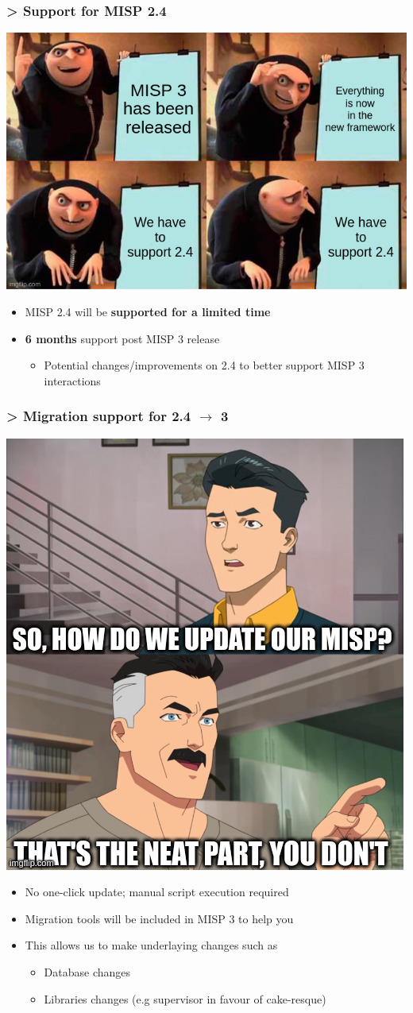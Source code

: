 \begin{frame}
    \frametitle{> Support for MISP 2.4}
    \vspace{-1em}
    \begin{center}
        \includegraphics[width=0.7\linewidth]{pictures/support-for-2.jpeg}
    \end{center}
    \vspace{-1em}
    \begin{itemize}
        \item MISP 2.4 will be \textbf{supported for a limited time}
        \item \textbf{6 months} support post MISP 3 release
        \begin{itemize}
            \item Potential changes/improvements on 2.4 to better support MISP 3 interactions
        \end{itemize}
    \end{itemize}
\end{frame}

\begin{frame}
    \frametitle{> Migration support for 2.4 $\rightarrow$ 3}
    \begin{center}
        \includegraphics[width=0.40\linewidth]{pictures/update}
    \end{center}
    \begin{itemize}
        \item No one-click update; manual script execution required
        \item Migration tools will be included in MISP 3 to help you
        \item This allows us to make underlaying changes such as
        \begin{itemize}
            \item Database changes
            \item Libraries changes (e.g supervisor in favour of cake-resque)
        \end{itemize}
    \end{itemize}
\end{frame}

